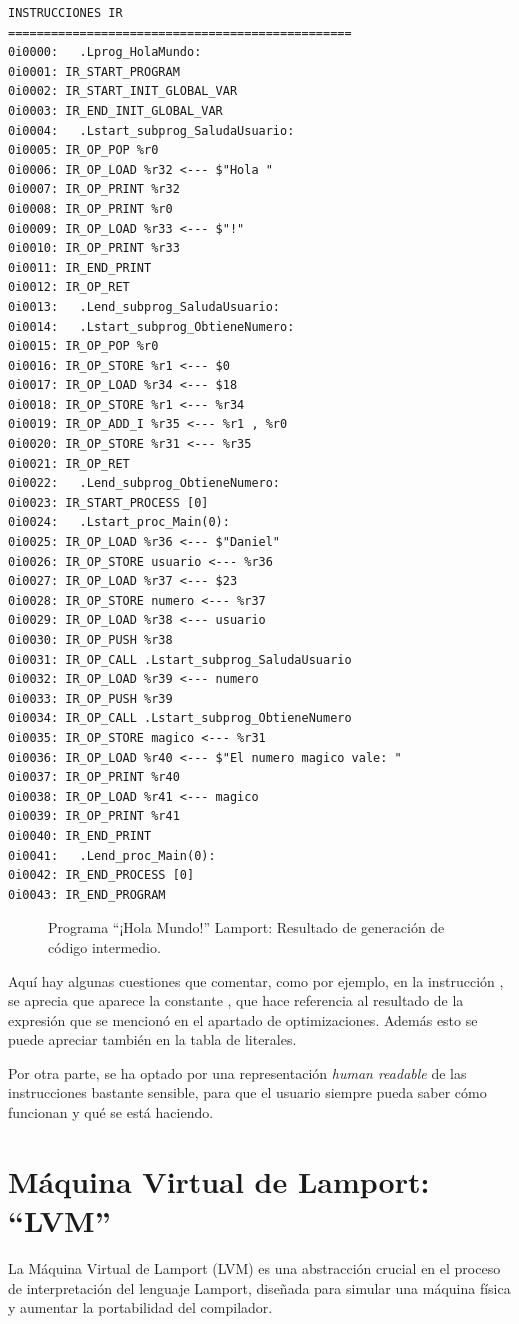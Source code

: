 \begin{verbatim}
INSTRUCCIONES IR
================================================
0i0000:   .Lprog_HolaMundo:
0i0001: IR_START_PROGRAM 
0i0002: IR_START_INIT_GLOBAL_VAR 
0i0003: IR_END_INIT_GLOBAL_VAR 
0i0004:   .Lstart_subprog_SaludaUsuario:
0i0005: IR_OP_POP %r0
0i0006: IR_OP_LOAD %r32 <--- $"Hola "
0i0007: IR_OP_PRINT %r32
0i0008: IR_OP_PRINT %r0
0i0009: IR_OP_LOAD %r33 <--- $"!"
0i0010: IR_OP_PRINT %r33
0i0011: IR_END_PRINT 
0i0012: IR_OP_RET 
0i0013:   .Lend_subprog_SaludaUsuario:
0i0014:   .Lstart_subprog_ObtieneNumero:
0i0015: IR_OP_POP %r0
0i0016: IR_OP_STORE %r1 <--- $0
0i0017: IR_OP_LOAD %r34 <--- $18
0i0018: IR_OP_STORE %r1 <--- %r34
0i0019: IR_OP_ADD_I %r35 <--- %r1 , %r0
0i0020: IR_OP_STORE %r31 <--- %r35
0i0021: IR_OP_RET 
0i0022:   .Lend_subprog_ObtieneNumero:
0i0023: IR_START_PROCESS [0]
0i0024:   .Lstart_proc_Main(0):
0i0025: IR_OP_LOAD %r36 <--- $"Daniel"
0i0026: IR_OP_STORE usuario <--- %r36
0i0027: IR_OP_LOAD %r37 <--- $23
0i0028: IR_OP_STORE numero <--- %r37
0i0029: IR_OP_LOAD %r38 <--- usuario
0i0030: IR_OP_PUSH %r38
0i0031: IR_OP_CALL .Lstart_subprog_SaludaUsuario
0i0032: IR_OP_LOAD %r39 <--- numero
0i0033: IR_OP_PUSH %r39
0i0034: IR_OP_CALL .Lstart_subprog_ObtieneNumero
0i0035: IR_OP_STORE magico <--- %r31
0i0036: IR_OP_LOAD %r40 <--- $"El numero magico vale: "
0i0037: IR_OP_PRINT %r40
0i0038: IR_OP_LOAD %r41 <--- magico
0i0039: IR_OP_PRINT %r41
0i0040: IR_END_PRINT 
0i0041:   .Lend_proc_Main(0):
0i0042: IR_END_PROCESS [0]
0i0043: IR_END_PROGRAM 
\end{verbatim}
\begin{figure}[hbtp]
\caption{Programa ``¡Hola Mundo!'' Lamport: Resultado de generación de código intermedio.}
\label{fig:IRHolaMundo}
\end{figure}

Aquí hay algunas cuestiones que comentar, como por ejemplo, en la instrucción , se aprecia que aparece la constante , que hace referencia al resultado de la expresión que se mencionó en el apartado de optimizaciones. Además esto se puede apreciar también en la tabla de literales. 


Por otra parte, se ha optado por una representación \textit{human readable} de las instrucciones bastante sensible, para que el usuario siempre pueda saber cómo funcionan y qué se está haciendo.

\section{Máquina Virtual de Lamport: ``LVM''}\label{sec:implementacionLVM}
La Máquina Virtual de Lamport (LVM) es una abstracción crucial en el proceso de interpretación del lenguaje Lamport, diseñada para simular una máquina física y aumentar la portabilidad del compilador.

